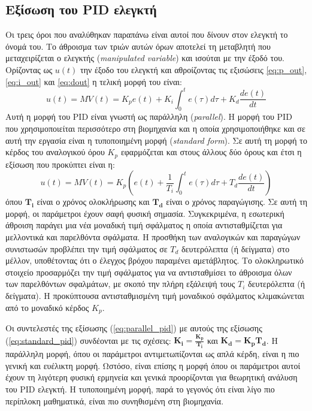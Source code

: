 \subsection{Εξίσωση του PID ελεγκτή}

Οι τρεις όροι που αναλύθηκαν παραπάνω είναι αυτοί που δίνουν στον ελεγκτή το όνομά του. Το άθροισμα των τριών αυτών όρων αποτελεί τη μεταβλητή που μεταχειρίζεται ο ελεγκτής (\emph{manipulated variable}) και ισούται με την έξοδό του. Ορίζοντας ως $u(t)$ την έξοδο του ελεγκτή και αθροίζοντας τις εξισώσεις \ref{eq:p_out}, \ref{eq:i_out} και \ref{eq:dout} η τελική μορφή του είναι:
\begin{equation}
u(t)=MV(t)=K_p e(t) + K_i \int_{0}^{t} e(\tau)d\tau + K_d \frac{de(t)}{dt}
\label{eq:parallel_pid}
\end{equation}
Αυτή η μορφή του PID είναι γνωστή ως παράλληλη (\emph{parallel}). Η μορφή του PID που χρησιμοποιείται περισσότερο στη βιομηχανία και η οποία χρησιμοποιήθηκε και σε αυτή την εργασία είναι η τυποποιημένη μορφή (\emph{standard form}). Σε αυτή τη μορφή το κέρδος του αναλογικού όρου $K_p$ εφαρμόζεται και στους άλλους δύο όρους και έτσι η εξίσωση που προκύπτει είναι η:
\begin{equation}
u(t)=MV(t)=K_p \left( e(t) + \frac{1}{T_i}\int_{0}^{t} e(\tau)d\tau + T_d\frac{de(t)}{dt} \right)
\label{eq:standard_pid}
\end{equation}
όπου $\boldsymbol{T_i}$ είναι ο χρόνος ολοκλήρωσης και $\boldsymbol{T_d}$ είναι ο χρόνος παραγώγισης. Σε αυτή τη μορφή, οι παράμετροι έχουν σαφή φυσική σημασία. Συγκεκριμένα, η εσωτερική άθροιση παράγει μια νέα μοναδική τιμή σφάλματος η οποία αντισταθμίζεται για μελλοντικά και παρελθόντα σφάλματα. Η προσθήκη των αναλογικών και παραγώγων συνιστωσών προβλέπει την τιμή σφάλματος σε $T_d$ δευτερόλεπτα (ή δείγματα) στο μέλλον, υποθέτοντας ότι ο έλεγχος βρόχου παραμένει αμετάβλητος. Το ολοκληρωτικό στοιχείο προσαρμόζει την τιμή σφάλματος για να αντισταθμίσει το άθροισμα όλων των παρελθόντων σφαλμάτων, με σκοπό την πλήρη εξάλειψή τους $T_i$ δευτερόλεπτα (ή δείγματα). Η προκύπτουσα αντισταθμισμένη τιμή μοναδικού σφάλματος κλιμακώνεται από το μοναδικό κέρδος $K_p$.

Οι συντελεστές της εξίσωσης (\ref{eq:parallel_pid}) με αυτούς της εξίσωσης (\ref{eq:standard_pid}) συνδέονται με τις σχέσεις: $\boldsymbol{K_i=\frac{K_p}{T_i}}$ και $\boldsymbol{K_d=K_p T_d}$. Η παράλληλη μορφή, όπου οι παράμετροι αντιμετωπίζονται ως απλά κέρδη, είναι η πιο γενική και ευέλικτη μορφή. Ωστόσο, είναι επίσης η μορφή όπου οι παράμετροι αυτοί έχουν τη λιγότερη φυσική ερμηνεία και γενικά προορίζονται για θεωρητική ανάλυση του PID ελεγκτή. Η τυποποιημένη μορφή, παρά το γεγονός ότι είναι λίγο πιο περίπλοκη μαθηματικά, είναι πιο συνηθισμένη στη βιομηχανία.


